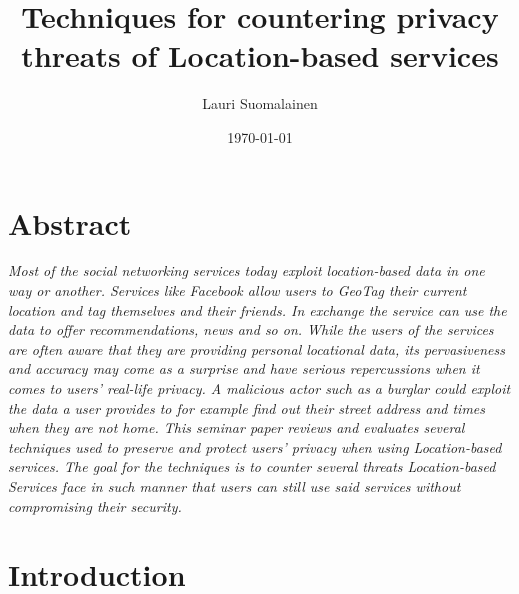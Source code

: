 \documentclass[english]{tktltiki2}
\title{Techniques for countering privacy threats of Location-based services}
\author{Lauri Suomalainen}
\date{\today}
\theoremstyle{definition}
\theoremstyle{remark}
\begin{document}

\frontmatter      %

\maketitle        %
\makeabstract     %

\tableofcontents  %


\mainmatter 
\onehalfspacing

\section*{Abstract}
 \textit{Most of the social networking services today exploit location-based data in one way or another. Services like Facebook allow users to GeoTag their current location and tag themselves and their friends. In exchange the service can use the data to offer recommendations, news and so on.  While the users of the services are often aware that they are providing personal locational data, its pervasiveness and accuracy may come as a surprise and have serious repercussions when it comes to users' real-life privacy. A malicious actor such as a burglar could exploit the data a user provides to for example find out their street address and times when they are not home.
This seminar paper reviews and evaluates several techniques used to preserve and protect users' privacy when using Location-based services. The goal for the techniques is to counter several threats Location-based Services face in such manner that users can still use said services without compromising their security.}

\section{Introduction}
\end{document}
